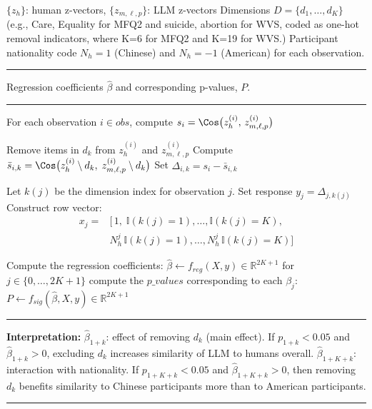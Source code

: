 \begin{algorithmic}[1]
  \Require $\{z_h\}$: human z-vectors, \quad
           $\{z_{m,\ell,p}\}$: LLM z-vectors  
  \Require Dimensions $D=\{d_1,\dots,d_K\}$ (e.g., Care, Equality for MFQ2 and suicide, abortion for WVS, coded as one-hot removal indicators, where K=6 for MFQ2 and K=19 for WVS.)  
  \Require Participant nationality code $N_h=1$ (Chinese) and $N_h=-1$ (American) for each observation. 
\vspace{0.5em}\hrule\vspace{0.5em}
  \Ensure Regression coefficients $\hat\beta$ and corresponding p-values, $P$.
\vspace{0.5em}\hrule\vspace{0.5em}
  \State For each observation $i\in obs$, compute $s_i = \Cos\bigl(z_h^{(i)},\,z_{m,\ell,p}^{(i)}\bigr)$

      \State Remove items in $d_k$ from $z_h^{(i)}$ and $z_{m,\ell,p}^{(i)}$
      \State Compute $\bar{s}_{i,k} = 
             \Cos\bigl(z_h^{(i)}\setminus d_k,\;z_{m,\ell,p}^{(i)}\setminus d_k\bigr)$
      \State Set $\Delta_{i,k} = s_i - \bar{s}_{i,k}$
    \EndFor
  \EndFor

    \State Let $k(j)$ be the dimension index for observation $j$.
    \State Set response $y_j = \Delta_{j,k(j)}$
    \State Construct row vector:
    \[
    \begin{split}
      x_j = &\bigl[\,1,\;\mathbb{I}(k(j)=1),\dots,\mathbb{I}(k(j)=K),\;\\
      &N_h^j\,\mathbb{I}(k(j)=1),\dots,N_h^j\,\mathbb{I}(k(j)=K)\bigr]
      \end{split}
    \]
  \EndFor

  \State Compute the regression coefficients: $\hat\beta \gets f_{reg}(X,y)\in\mathbb{R}^{2K+1}$
  \State for $j\in\{0,\dots,2K+1\}$ compute the $p\_values$ corresponding to each $\beta_j$: $P \gets f_{sig}(\hat\beta,X,y)\in\mathbb{R}^{2K+1}$ 
  \vspace{1em}\hrule\vspace{0.5em}

  \Statex\textbf{Interpretation:}
  \Indent
      \State $\hat\beta_{1+k}$: effect of removing $d_k$ (main effect).  
        If $p_{1+k}<0.05$ and $\hat\beta_{1+k}>0$, excluding $d_k$ increases similarity  of LLM to humans overall.
      \State $\hat\beta_{1+K+k}$: interaction with nationality.  
        If $p_{1+K+k}<0.05$ and $\hat\beta_{1+K+k}>0$, then removing $d_k$ benefits similarity to Chinese participants more than to American participants.
    \EndFor
  \EndIndent
\end{algorithmic}
\vspace{0.5em}\hrule
